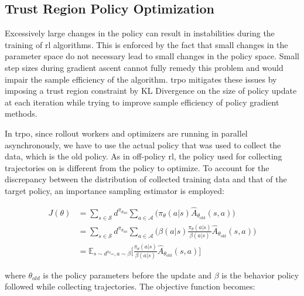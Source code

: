 \subsection{Trust Region Policy Optimization}
Excessively large changes in the policy can result in instabilities during the training of \gls{rl} algorithms. 
This is enforced by the fact that small changes in the parameter space do not necessary lead to small changes in the policy space. 
Small step sizes during gradient ascent cannot fully remedy this problem and would impair the sample efficiency of
the algorithm. \gls{trpo} \cite{schulman2017trustregionpolicyoptimization} mitigates these issues by imposing a trust region
constraint by KL Divergence on the size of policy update at each iteration while trying to improve sample efficiency 
of policy gradient methods.

In \gls{trpo}, since rollout workers and optimizers are running in parallel asynchronously, we have to 
use the actual policy that was used to collect the data, which is the old policy.
As in off-policy \gls{rl}, the policy used for collecting trajectories on is different from the policy 
to optimize. To account for the discrepancy between the distribution of collected training data and 
that of the target policy, an importance sampling estimator is employed:

\begin{align}
    J(\theta)
    &= \sum_{s \in \mathcal{S}} d^{\pi_{\theta_\text{old}}} \sum_{a \in \mathcal{A}} \big( \pi_\theta(a \vert s) \hat{A}_{\theta_\text{old}}(s, a) \big)  \nonumber\\
    &= \sum_{s \in \mathcal{S}} d^{\pi_{\theta_\text{old}}} \sum_{a \in \mathcal{A}} \big( \beta(a \vert s) \frac{\pi_\theta(a \vert s)}{\beta(a \vert s)} \hat{A}_{\theta_\text{old}}(s, a) \big) \nonumber\\
    &= \mathbb{E}_{s \sim d^{\pi_{\theta_\text{old}}}, a \sim \beta} \big[ \frac{\pi_\theta(a \vert s)}{\beta(a \vert s)} \hat{A}_{\theta_\text{old}}(s, a) \big] \nonumber
\end{align}

where $\theta_{old}$ is the policy parameters before the update and $\beta$ is the behavior policy followed while collecting trajectories. 
The objective function becomes:

